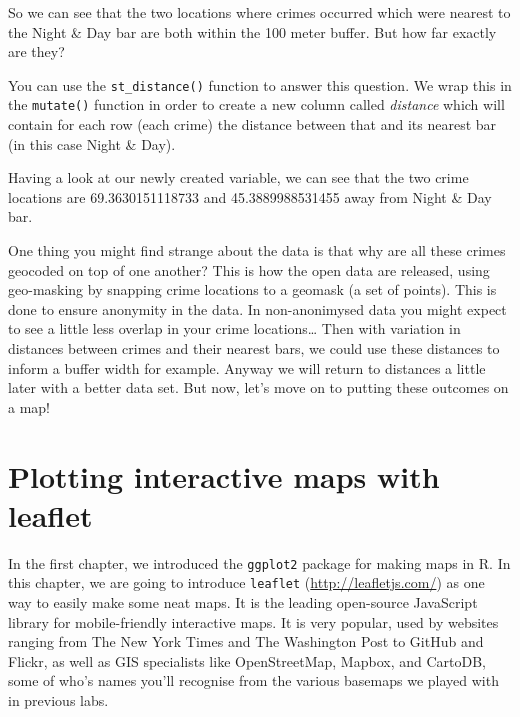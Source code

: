 \documentclass[
]{book}
\makeatletter
\newenvironment{Shaded}{\begin{snugshade}}{\end{snugshade}}
\newcommand{\AttributeTok}[1]{\textcolor[rgb]{0.61,0.61,0.61}{#1}}
\newcommand{\FunctionTok}[1]{\textcolor[rgb]{0,0,0}{#1}}
\newcommand{\NormalTok}[1]{#1}
\newcommand{\OtherTok}[1]{\textcolor[rgb]{0.37,0.37,0.37}{#1}}
\newcommand{\SpecialCharTok}[1]{\textcolor[rgb]{0,0,0}{#1}}
\newenvironment{kframe}{%
\medskip{}
\setlength{\fboxsep}{.8em}
 \def\at@end@of@kframe{}%
 \ifinner\ifhmode%
  \def\at@end@of@kframe{\end{minipage}}%
  \begin{minipage}{\columnwidth}%
 \fi\fi%
 \def\FrameCommand##1{\hskip\@totalleftmargin \hskip-\fboxsep
 \colorbox{shadecolor}{##1}\hskip-\fboxsep
     \hskip-\linewidth \hskip-\@totalleftmargin \hskip\columnwidth}%
 \MakeFramed {\advance\hsize-\width
   \@totalleftmargin\z@ \linewidth\hsize
   \@setminipage}}%
 {\par\unskip\endMakeFramed%
 \at@end@of@kframe}
\renewenvironment{Shaded}{\begin{kframe}}{\end{kframe}}
\makeatother
\begin{document}
So we can see that the two locations where crimes occurred which were nearest to the Night \& Day bar are both within the 100 meter buffer. But how far exactly are they?

You can use the \texttt{st\_distance()} function to answer this question. We wrap this in the \texttt{mutate()} function in order to create a new column called \emph{distance} which will contain for each row (each crime) the distance between that and its nearest bar (in this case Night \& Day).

\begin{Shaded}
\end{Shaded}

Having a look at our newly created variable, we can see that the two crime locations are 69.3630151118733 and 45.3889988531455 away from Night \& Day bar.

One thing you might find strange about the data is that why are all these crimes geocoded on top of one another? This is how the open data are released, using geo-masking by snapping crime locations to a geomask (a set of points). This is done to ensure anonymity in the data. In non-anonimysed data you might expect to see a little less overlap in your crime locations\ldots{} Then with variation in distances between crimes and their nearest bars, we could use these distances to inform a buffer width for example. Anyway we will return to distances a little later with a better data set. But now, let's move on to putting these outcomes on a map!

\hypertarget{plotting-interactive-maps-with-leaflet}{%
\section{Plotting interactive maps with leaflet}\label{plotting-interactive-maps-with-leaflet}}

In the first chapter, we introduced the \texttt{ggplot2} package for making maps in R. In this chapter, we are going to introduce \texttt{leaflet} (\url{http://leafletjs.com/}) as one way to easily make some neat maps. It is the leading open-source JavaScript library for mobile-friendly interactive maps. It is very popular, used by websites ranging from The New York Times and The Washington Post to GitHub and Flickr, as well as GIS specialists like OpenStreetMap, Mapbox, and CartoDB, some of who's names you'll recognise from the various basemaps we played with in previous labs.
\end{document}
